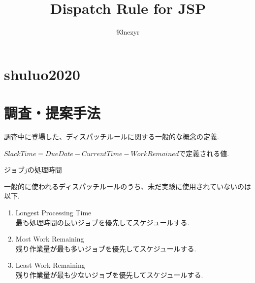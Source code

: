 \documentclass{ltjsarticle}
\begin{document}
\title{Dispatch Rule for JSP}
\author{93nezyr}
\maketitle

\section{shuluo2020}

\section{調査・提案手法}

調査中に登場した、ディスパッチルールに関する一般的な概念の定義.

\begin{description}[style=multiline, leftmargin=10em]
  \item[$SlackTime$] $SlackTime = DueDate - CurrentTime - WorkRemained$で定義される値.
  \item[$P_j$] ジョブ$j$の処理時間
\end{description}

一般的に使われるディスパッチルールのうち、未だ実験に使用されていないのは以下.

\begin{enumerate}
  \item Longest Processing Time \\
        最も処理時間の長いジョブを優先してスケジュールする.
  \item Most Work Remaining \\
        残り作業量が最も多いジョブを優先してスケジュールする.
  \item Least Work Remaining \\
        残り作業量が最も少ないジョブを優先してスケジュールする.
\end{enumerate}
\end{document}
